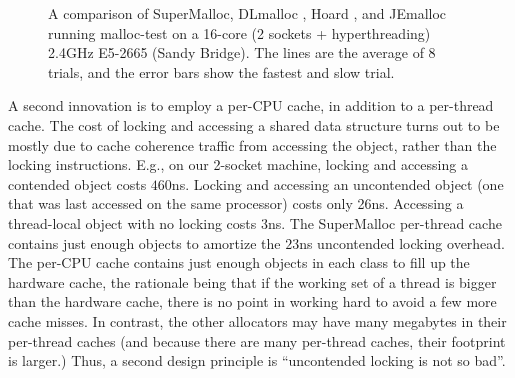\documentclass[10pt,letterpaper,twocolumn]{article}
\begin{document}
\begin{figure}

\caption{A comparison of SuperMalloc, DLmalloc \cite{Lea96}, Hoard
  \cite{BergerMcBl00}, and JEmalloc~\cite{Evans06} running malloc-test
  on a 16-core (2 sockets + hyperthreading) 2.4GHz E5-2665 (Sandy
  Bridge).  The lines are the average of 8 trials, and the error bars
  show the fastest and slow trial.}
\label{fig:data}
\vspace*{-3ex}
\end{figure}


A second innovation is to employ a per-CPU cache, in addition to a
per-thread cache.  The cost of locking and accessing a shared data
structure turns out to be mostly due to cache coherence traffic from
accessing the object, rather than the locking instructions.  E.g., on
our 2-socket machine, locking and accessing a contended object costs
$460$ns.  Locking and accessing an uncontended object (one that was
last accessed on the same processor) costs only 26ns.  Accessing a
thread-local object with no locking costs $3$ns.  The SuperMalloc
per-thread cache contains just enough objects to amortize the $23$ns
uncontended locking overhead.  The per-CPU cache contains just enough
objects in each class to fill up the hardware cache, the rationale
being that if the working set of a thread is bigger than the hardware
cache, there is no point in working hard to avoid a few more cache
misses.  In contrast, the other allocators may have many megabytes in
their per-thread caches (and because there are many per-thread caches,
their footprint is larger.)  Thus, a second design principle is
``uncontended locking is not so bad''.
\end{document}
